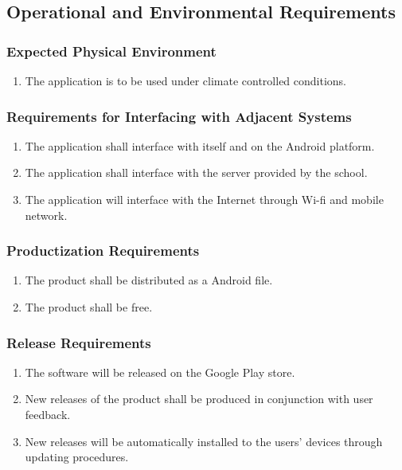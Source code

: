 \documentclass[]{article}
\begin{document}

\subsection{Operational and Environmental Requirements}
\label{sub:operational_and_environmental_requirements}

\subsubsection{Expected Physical Environment}
\label{ssub:expected_physical_environment}
\begin{enumerate}[{OE}1. ]
	\item The application is to be used under climate controlled conditions.
\end{enumerate}

\subsubsection{Requirements for Interfacing with Adjacent Systems}
\label{ssub:requirements_for_interfacing_with_adjacent_systems}
\begin{enumerate}[{OE}1. ]
	\item The application shall interface with itself and on the Android platform.
	\item The application shall interface with the server provided by the school.
	\item The application will interface with the Internet through Wi-fi and mobile network.
\end{enumerate}

\subsubsection{Productization Requirements}
\label{ssub:productization_requirements}
\begin{enumerate}[{OE}1. ]
	\item The product shall be distributed as a Android file.
	\item The product shall be free.
\end{enumerate}

\subsubsection{Release Requirements}
\label{ssub:release_requirements}
\begin{enumerate}[{OE}1. ]
	\item The software will be released on the Google Play store.
	\item New releases of the product shall be produced in conjunction with user feedback.
	\item New releases will be automatically installed to the users’ devices through updating procedures.
\end{enumerate}
\end{document}
